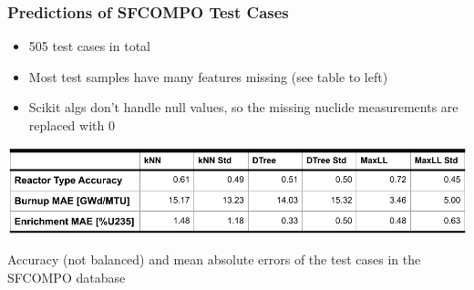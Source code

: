 \begin{frame}
  \frametitle{Predictions of SFCOMPO Test Cases}
  \begin{adjustwidth}{-15pt}{0pt}
  \begin{minipage}{0.85\textwidth}
    \begin{itemize}
      \item 505 test cases in total 
      \item Most test samples have many features missing (see table to left)
      \item Scikit algs don't handle null values, so the missing nuclide measurements are replaced with $0$
    \end{itemize}
    \bigskip
    \begin{table}
      \includegraphics[width=\textwidth]{./figures/sfcompo_pred_results.png}
      \caption{Accuracy (not balanced) and mean absolute errors of the test cases in the SFCOMPO database}
    \end{table}
  \end{minipage}%
  \hfill
  \begin{minipage}{0.15\textwidth}
    \begin{table}

\end{table}
\end{minipage}
\end{adjustwidth}
\end{frame}
